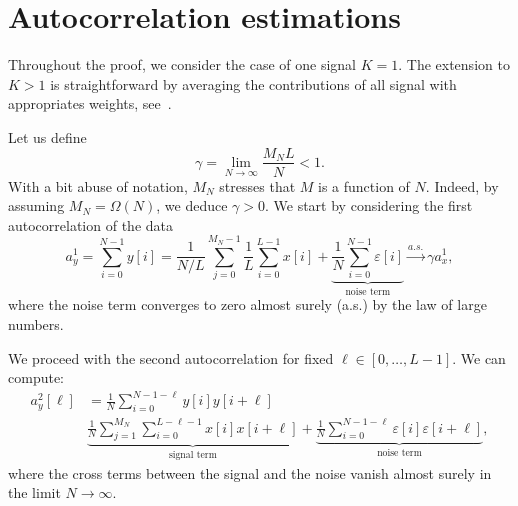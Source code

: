 \documentclass[english,11pt]{article}
\numberwithin{equation}{section}
\theoremstyle{plain}
\theoremstyle{definition}
\theoremstyle{remark}
\theoremstyle{plain}
\theoremstyle{remark}
\theoremstyle{plain}
\theoremstyle{plain}
\begin{document}





\appendix

\section{Autocorrelation estimations} \label{sec:autocorrelation_computation}

Throughout the proof, we consider the case of one signal $K=1$. The extension to $K>1$ is straightforward by averaging the contributions of all signal with  appropriates weights, see~\cite{boumal2017heterogeneous}. 

Let us define
\begin{equation}
\gamma = \lim_{N\to\infty} \frac{M_NL}{N}<1.
\end{equation}
With a bit abuse of notation, $M_N$ stresses that $M$ is a function of $N$. Indeed, by assuming $M_N=\Omega(N)$, we deduce $\gamma>0$.
We start by considering the first autocorrelation of the data
\begin{equation}
a_y^1 = \sum_{i=0}^{N-1} y[i] = \frac{1}{N/L}\sum_{j=0}^{M_N-1}\frac{1}{L}\sum_{i=0}^{L-1}x[i] + \underbrace{\frac{1}{N}\sum_{i=0}^{N-1}\varepsilon[i]}_{\text{noise term}} \xrightarrow{a.s.}\gamma a_x^1,
\end{equation}
where the noise term converges to zero almost surely (a.s.) by the law of large numbers.

We proceed with the second autocorrelation for fixed $\ell\in[0,\ldots,L-1]$. We can compute:
\begin{equation}
\begin{split}
a_y^2[\ell] & = \frac{1}{N}\sum_{i=0}^{N-1-\ell}y[i]y[i+\ell] \\
& \underbrace{\frac{1}{N}\sum_{j=1}^{M_N}\sum_{i=0}^{L-\ell-1}x[i]x[i+\ell]}_{\text{signal term}} + \underbrace{\frac{1}{N}\sum_{i=0}^{N-1-\ell}\varepsilon[i]\varepsilon[i+\ell]}_{\text{noise term}},
\end{split}
\end{equation}
where the cross terms between the signal and the noise vanish  almost surely in the limit $N\to\infty$. 
\end{document}
